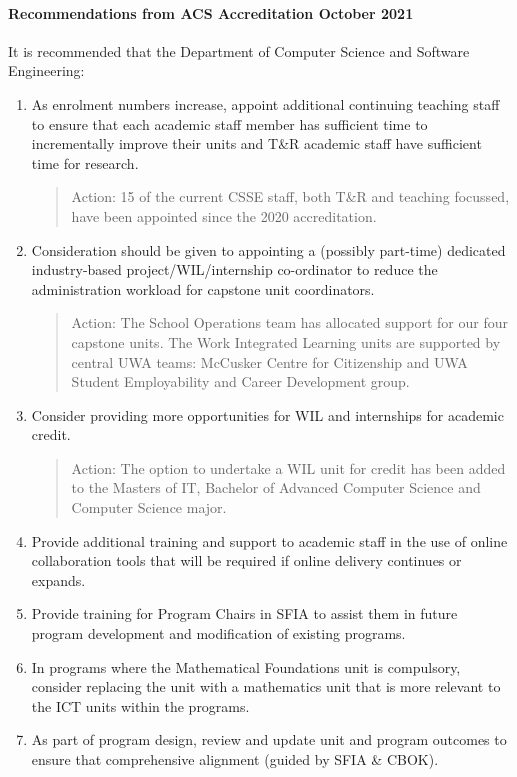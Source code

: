 
\paragraph{Recommendations from ACS Accreditation October 2021}

It is recommended that the Department of Computer Science and Software Engineering:
\begin{enumerate}
\item As enrolment numbers increase, appoint additional continuing teaching staff to ensure that each academic staff member has sufficient time to incrementally improve their units and T\&R academic staff have sufficient time for research.

\begin{quote}
\color{blue}
{Action: 15 of the current CSSE staff, both T\&R and teaching focussed, have been appointed since the 2020 accreditation.}
\end{quote}

\item Consideration should be given to appointing a (possibly part-time) dedicated industry-based project/WIL/internship co-ordinator to reduce the administration workload for
capstone unit coordinators.

\begin{quote}
\color{blue}
{Action: The School Operations team has allocated support for our four capstone units.  The Work Integrated Learning units are supported by central UWA teams: McCusker Centre for Citizenship and UWA Student Employability and Career Development group.}
\end{quote}

\item Consider providing more opportunities for WIL and internships for academic credit.

\begin{quote}
\color{blue}
{Action: The option to undertake a WIL unit for credit has been added to the Masters of IT, Bachelor of Advanced Computer Science and Computer Science major.}
\end{quote}

\item Provide additional training and support to academic staff in the use of online collaboration
tools that will be required if online delivery continues or expands.
\item Provide training for Program Chairs in SFIA to assist them in future program development
and modification of existing programs.
\item In programs where the Mathematical Foundations unit is compulsory, consider replacing
the unit with a mathematics unit that is more relevant to the ICT units within the programs.
\item As part of program design, review and update unit and program outcomes to ensure that
comprehensive alignment (guided by SFIA \& CBOK).


\end{enumerate}
